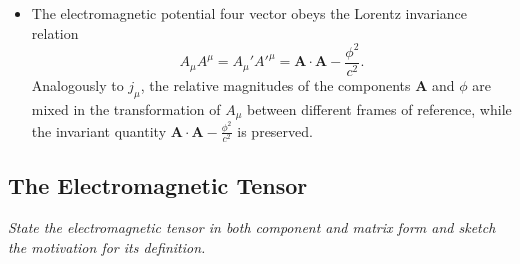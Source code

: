 \documentclass[11pt, a4paper]{article}
\renewcommand{\vec}[1]{\bm{#1}} %
\newcommand{\A}{\vec{A}} %
\begin{document}
\begin{itemize}
    \item The electromagnetic potential four vector obeys the Lorentz invariance relation
	\begin{equation*}
		A_{\mu}A^{\mu} = A_{\mu}' A'^{\mu} = \A \cdot \A - \frac{\phi^{2}}{c^{2}}.
	\end{equation*}
    Analogously to $ j_{\mu} $, the relative magnitudes of the components $ \A $ and $ \phi $ are mixed in the transformation of $ A_{\mu} $ between different frames of reference, while the invariant quantity $ \A \cdot \A - \frac{\phi^{2}}{c^{2}} $ is preserved.
\end{itemize}
    
\subsection{The Electromagnetic Tensor}
\textit{State the electromagnetic tensor in both component and matrix form and sketch the motivation for its definition.}
\end{document}
